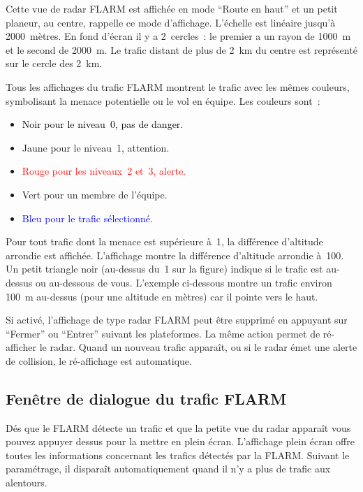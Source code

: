 Cette vue de radar FLARM est affichée en mode ``Route en haut'' et un petit planeur, au centre, rappelle ce mode d'affichage. L'échelle est linéaire jusqu'à 2000~mètres. En fond d'écran il y a 2~cercles~: le premier a un rayon de 1000~m et le second de 2000~m. Le trafic distant de plus de 2~km du centre est représenté sur le cercle des 2~km.

Tous les affichages du trafic FLARM montrent le trafic avec les mêmes couleurs, symbolisant la menace potentielle ou le vol en équipe. Les couleurs sont~:
\begin{itemize}
\item \textcolor{black} {Noir pour le niveau~0, pas de danger.} 
\item \textcolor{warning} {Jaune pour le niveau~1, attention.}
\item \textcolor{red} {Rouge pour les niveaux~2 et~3, alerte.}
\item \textcolor{teammate} {Vert pour un membre de l'équipe.}
\item \textcolor{blue} {Bleu pour le trafic sélectionné.}
\end{itemize}

Pour tout trafic dont la menace est supérieure à~1, la différence d'altitude arrondie est affichée. L'affichage montre la différence d'altitude arrondie à~100. Un petit triangle noir (au-dessus du~1 sur la figure) indique si le trafic est au-dessus ou au-dessous de vous. L'exemple ci-dessous montre un trafic environ 100~m au-dessus (pour une altitude en mètres) car il pointe vers le haut. 

Si activé, l'affichage de type radar FLARM peut être supprimé en appuyant sur ``Fermer'' ou ``Entrer'' suivant les plateformes.
La même action permet de ré-afficher le radar. Quand un nouveau trafic apparaît, ou si le radar émet une alerte de collision, le ré-affichage est automatique.

\subsection*{Fenêtre de dialogue du trafic FLARM}\label{sec:flarm-traffic}

Dés que le FLARM détecte un trafic et que la petite vue du radar apparaît vous pouvez appuyer dessus pour la mettre en plein écran.
L'affichage plein écran offre toutes les informations
concernant les trafics détectés par la FLARM. Suivant le paramétrage, il disparaît automatiquement quand il n'y a plus de trafic aux alentours.

